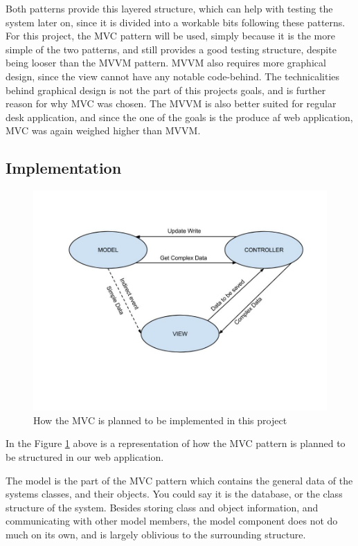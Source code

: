 Both patterns provide this layered structure, which can help with testing the system later on, since it is divided into a workable bits following these patterns. For this project, the MVC pattern will be used, simply because it is the more simple of the two patterns, and still provides a good testing structure, despite being looser than the MVVM pattern. MVVM also requires more graphical design, since the view cannot have any notable code-behind. The technicalities behind graphical design is not the part of this projects goals, and is further reason for why MVC was chosen. The MVVM is also better suited for regular desk application, and since the one of the goals is the produce af web application, MVC was again weighed higher than MVVM.

\subsection{Implementation}

\begin{figure}[htb]
\centering
\includegraphics[width=1\textwidth]{Images/MVC.jpg}
\caption{How the MVC is planned to be implemented in this project}
\label{MVC}
\end{figure}

In the Figure \ref{MVC} above is a representation of how the MVC pattern is planned to be structured in our web application.

The model is the part of the MVC pattern which contains the general data of the systems classes, and their objects. You could say it is the database, or the class structure of the system. Besides storing class and object information, and communicating with other model members, the model component does not do much on its own, and is largely oblivious to the surrounding structure.

